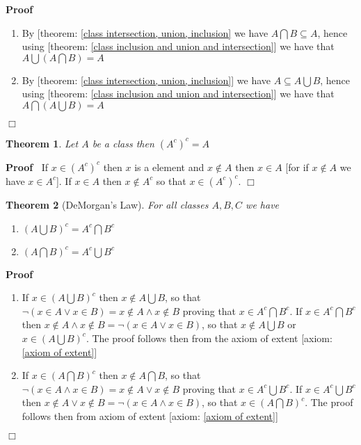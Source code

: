 \documentclass{book}
\newcommand{\nin}{\not\in}
\newenvironment{proof}{\noindent\textbf{Proof\ }}{\hspace*{\fill}$\Box$\medskip}
\newtheorem{theorem}{Theorem}
\begin{document}
\begin{proof}
  
  \begin{enumerate}
    \item By [theorem: \ref{class intersection, union, inclusion} we have $A
    \bigcap B \subseteq A$, hence using [theorem: \ref{class inclusion and
    union and intersection}] we have that $A \bigcup \left( A \bigcap B
    \right) = A$
    
    \item By [theorem: \ref{class intersection, union, inclusion}] we have $A
    \subseteq A \bigcup B$, hence using [theorem: \ref{class inclusion and
    union and intersection}] we have that $A \bigcap \left( A \bigcup B
    \right) = A$
  \end{enumerate}
\end{proof}

\begin{theorem}
  \label{class complement of comploment}Let $A$ be a class then $(A^c)^c = A$
\end{theorem}

\begin{proof}
  If $x \in (A^c)^c$ then $x$ is a element and $x \nin A$ then $x \in A$ [for
  if $x \nin A$ we have $x \in A^c$]. If $x \in A$ then $x \nin A^c$ so that
  $x \in (A^c)^c$.
\end{proof}

\begin{theorem}[DeMorgan's Law]
  \label{class de Morgan's law}For all classes $A, B, C$ we have
  \begin{enumerate}
    \item $\left( A \bigcup B \right)^c = A^c \bigcap B^c$
    
    \item $\left( A \bigcap B \right)^c = A^c \bigcup B^c$
  \end{enumerate}
\end{theorem}

\begin{proof}
  
  \begin{enumerate}
    \item If $x \in \left( A \bigcup B \right)^c$ then $x \nin A \bigcup B$,
    so that $\neg (x \in A \vee x \in B) = x \nin A \wedge x \nin B$ proving
    that $x \in A^c \bigcap B^c$. If $x \in A^c \bigcap B^c$ then $x \nin A
    \wedge x \nin B = \neg (x \in A \vee x \in B)$, so that $x \nin A \bigcup
    B$ or $x \in \left( A \bigcup B \right)^c$. The proof follows then from
    the axiom of extent [axiom: \ref{axiom of extent}]
    
    \item If $x \in \left( A \bigcap B \right)^c$ then $x \nin A \bigcap B$,
    so that $\neg (x \in A \wedge x \in B) = x \nin A \vee x \nin B$ proving
    that $x \in A^c \bigcup B^c$. If $x \in A^c \bigcup B^c$ then $x \nin A
    \vee x \nin B = \neg (x \in A \wedge x \in B)$, so that $x \in \left( A
    \bigcap B \right)^c$. The proof follows then from axiom of extent [axiom:
    \ref{axiom of extent}]
  \end{enumerate}
\end{proof}
\end{document}
